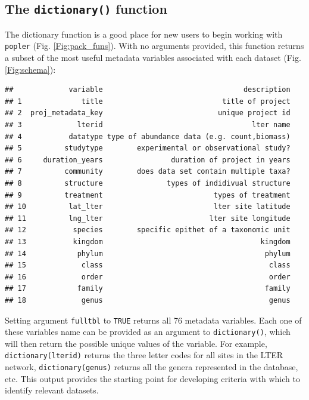 \documentclass{article}\usepackage[]{graphicx}\usepackage[]{color}
\makeatletter
\newenvironment{kframe}{%
 \def\at@end@of@kframe{}%
 \ifinner\ifhmode%
  \def\at@end@of@kframe{\end{minipage}}%
  \begin{minipage}{\columnwidth}%
 \fi\fi%
 \def\FrameCommand##1{\hskip\@totalleftmargin \hskip-\fboxsep
 \colorbox{shadecolor}{##1}\hskip-\fboxsep
     \hskip-\linewidth \hskip-\@totalleftmargin \hskip\columnwidth}%
 \MakeFramed {\advance\hsize-\width
   \@totalleftmargin\z@ \linewidth\hsize
   \@setminipage}}%
 {\par\unskip\endMakeFramed%
 \at@end@of@kframe}
\newenvironment{knitrout}{}{} %
\makeatother
\begin{document}
\subsection*{The \texttt{dictionary()} function}
The dictionary function is a good place for new users to begin working with \texttt{popler} (Fig. \ref{Fig:pack_funs}). With no arguments provided, this function returns a subset of the most useful metadata variables associated with each  dataset (Fig. \ref{Fig:schema}):
\begin{knitrout}
\color{fgcolor}\begin{kframe}
\begin{verbatim}
##             variable                                 description
## 1              title                            title of project
## 2  proj_metadata_key                           unique project id
## 3             lterid                                   lter name
## 4           datatype type of abundance data (e.g. count,biomass)
## 5          studytype        experimental or observational study?
## 6     duration_years                duration of project in years
## 7          community        does data set contain multiple taxa?
## 8          structure               types of indidivual structure
## 9          treatment                          types of treatment
## 10          lat_lter                          lter site latitude
## 11          lng_lter                         lter site longitude
## 12           species        specific epithet of a taxonomic unit
## 13           kingdom                                     kingdom
## 14            phylum                                      phylum
## 15             class                                       class
## 16             order                                       order
## 17            family                                      family
## 18             genus                                       genus
\end{verbatim}
\end{kframe}
\end{knitrout}
Setting argument \texttt{full\textunderscore tbl} to \texttt{TRUE} returns all 76 metadata variables. Each one of these variables name can be provided as an argument to \texttt{dictionary()}, which will then return the possible unique values of the variable. For example, \texttt{dictionary(lterid)} returns the three letter codes for all sites in the LTER network, \texttt{dictionary(genus)} returns all the genera represented in the database, etc. This output provides the starting point for developing criteria with which to identify relevant datasets.
\end{document}
